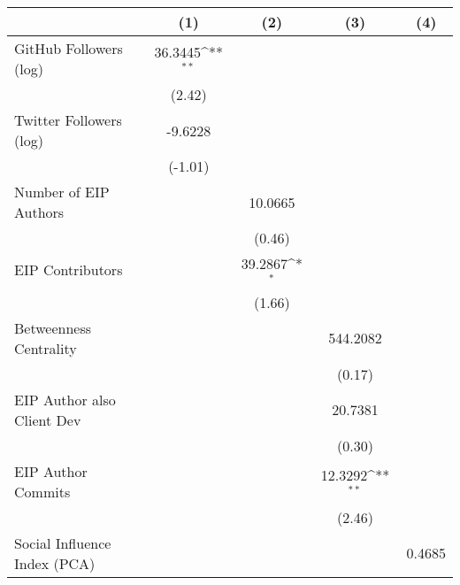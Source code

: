 {
\def\sym#1{\ifmmode^{#1}\else\(^{#1}\)\fi}
\begin{tabular}{l*{4}{c}}
\hline\hline
                                   &\multicolumn{1}{c}{(1)}         &\multicolumn{1}{c}{(2)}         &\multicolumn{1}{c}{(3)}         &\multicolumn{1}{c}{(4)}         \\
\hline
GitHub Followers (log)             &   36.3445\sym{**} &                   &                   &                   \\
                                   &    (2.42)         &                   &                   &                   \\
[1em]
Twitter Followers (log)            &   -9.6228         &                   &                   &                   \\
                                   &   (-1.01)         &                   &                   &                   \\
[1em]
Number of EIP Authors              &                   &   10.0665         &                   &                   \\
                                   &                   &    (0.46)         &                   &                   \\
[1em]
EIP Contributors                   &                   &   39.2867\sym{*}  &                   &                   \\
                                   &                   &    (1.66)         &                   &                   \\
[1em]
Betweenness Centrality             &                   &                   &  544.2082         &                   \\
                                   &                   &                   &    (0.17)         &                   \\
[1em]
EIP Author also Client Dev         &                   &                   &   20.7381         &                   \\
                                   &                   &                   &    (0.30)         &                   \\
[1em]
EIP Author Commits                 &                   &                   &   12.3292\sym{**} &                   \\
                                   &                   &                   &    (2.46)         &                   \\
[1em]
Social Influence Index (PCA)       &                   &                   &                   &    0.4685         \\

\end{tabular}}
